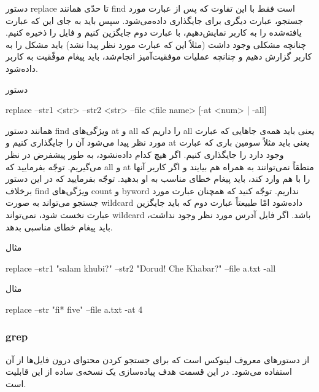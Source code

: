 \documentclass[]{article}
\begin{document}
دستور replace تا حدّی همانند find است فقط با این تفاوت که پس از عبارت مورد جستجو، عبارت دیگری برای جایگذاری داده‌می‌شود. سپس باید به جای این که عبارت یافته‌شده را به کاربر نمایش‌دهیم، با عبارت دوم جایگزین کنیم و فایل را ذخیره کنیم. چنانچه مشکلی وجود داشت (مثلاً این که عبارت مورد نظر پیدا نشد) باید مشکل را به کاربر گزارش دهیم و چنانچه عملیات موفقیت‌آمیز انجام‌شد، باید پیغام موفّقیت به کاربر داده‌شود.

\begin{mybox}[colback=yellow]{دستور}
	\begin{latin}	
		replace --str1 <str> --str2 <str> --file <file name> [-at <num> | -all]
	\end{latin}
\end{mybox}

همانند دستور find ویژگی‌های at و all را داریم که all یعنی باید همه‌ی جاهایی که عبارت مورد نظر پیدا می‌شود آن را جایگذاری کنیم و at یعنی باید مثلاً سومین باری که عبارت وجود دارد را جایگذاری کنیم. اگر هیچ کدام داده‌نشود، به طور پیشفرض  در نظر می‌گیریم. توجّه بفرمایید که all و at منطقاً نمی‌توانند به همراه هم بیایند و اگر کاربر آنها را با هم وارد کند، باید پیغام خطای مناسب به او بدهید. توجّه بفرمایید که در این دستور برخلاف find ویژگی‌های count و byword نداریم.
	توجّه کنید که همچنان عبارت مورد جستجو می‌تواند به صورت wildcard داده‌شود امّا طبیعتاً عبارت دوم که باید جایگزین عبارت نخست شود، نمی‌تواند wildcard باشد.
	اگر فایل آدرس مورد نظر وجود نداشت، باید پیغام خطای مناسبی بدهد.

 \begin{mybox}[colback=yellow]{مثال}
	\begin{latin}	
		replace --str1 "salam khubi?" --str2 "Dorud! Che Khabar?" --file a.txt -all
	\end{latin}
\end{mybox}

 \begin{mybox}[colback=yellow]{مثال}
	\begin{latin}
            replace --str "fi* five"  --file a.txt -at 4
	\end{latin}
\end{mybox}


\subsubsection*{{\titr grep}}

از دستورهای معروف لینوکس است که برای جستجو کردن محتوای درون فایل‌ها از آن استفاده می‌شود. در این قسمت هدف پیاده‌سازی یک نسخه‌ی ساده از این قابلیت است.
\end{document}
